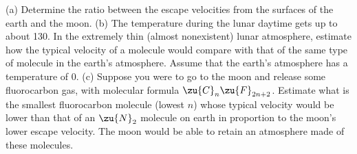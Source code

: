 (a) Determine the ratio between the escape velocities
from the surfaces of the earth and the moon.  \answercheck\hwendpart
(b) The
temperature during the lunar daytime gets up to about 130\degcunit.
In the extremely thin (almost nonexistent) lunar atmosphere,
estimate how the typical velocity of a molecule would
compare with that of the same type of molecule in the
earth's atmosphere. Assume that the earth's atmosphere has
a temperature of 0\degcunit.  \answercheck\hwendpart
(c) Suppose you were to go to the moon
and release some fluorocarbon gas, with molecular formula
$\zu{C}_n\zu{F}_{2n+2}$. Estimate what is the smallest fluorocarbon molecule
(lowest $n$) whose typical velocity would be lower than that
of an $\zu{N}_2$ molecule on earth in proportion to the moon's lower
escape velocity. The moon would be able to retain an atmosphere made
of these molecules. \answercheck
